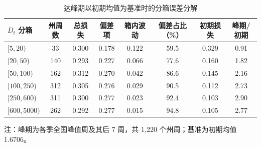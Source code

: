 \begin{table}[!tbp]
  \centering
  \caption{达峰期以初期均值为基准时的分箱误差分解}
  \label{tab:peak-bins}
  \small
  \begin{tabular}{@{}lccccccc@{}}
    \toprule
    $D_t$ 分箱 & 州周数 & 总损失 & 偏差项 & 箱内波动 & 偏差占比（\%） & 初期损失 & 峰期/初期 \\
    \midrule
    $[5,20)$ & 33 & 0.300 & 0.178 & 0.122 & 59.5 & 0.329 & 0.91 \\
    $[20,50)$ & 140 & 0.293 & 0.227 & 0.066 & 77.6 & 0.160 & 1.82 \\
    $[50,100)$ & 162 & 0.312 & 0.270 & 0.042 & 86.6 & 0.145 & 2.16 \\
    $[100,250)$ & 312 & 0.305 & 0.276 & 0.029 & 90.5 & 0.112 & 2.73 \\
    $[250,600)$ & 311 & 0.300 & 0.277 & 0.023 & 92.4 & 0.103 & 2.90 \\
    $[600,5000)$ & 262 & 0.292 & 0.277 & 0.015 & 94.8 & 0.105 & 2.77 \\
    \bottomrule
  \end{tabular}

  \vspace{4pt}
  {\small 注：峰期为各季全国峰值周及其后 7 周，共 1,220 个州周；基准为初期均值 1.6706。}
\end{table}
